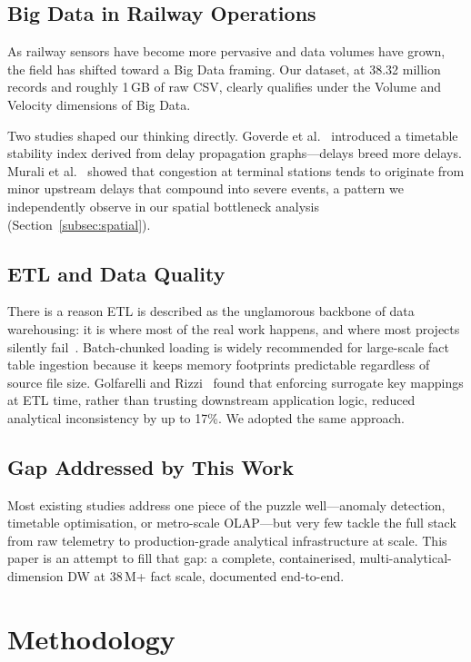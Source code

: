 \documentclass[conference]{IEEEtran}
\begin{document}
\subsection{Big Data in Railway Operations}

As railway sensors have become more pervasive and data volumes have grown,
the field has shifted toward a Big Data framing.
Our dataset, at 38.32 million records and roughly 1\,GB of raw CSV,
clearly qualifies under the Volume and Velocity dimensions of Big Data.

Two studies shaped our thinking directly.
Goverde et al.~\cite{b5} introduced a timetable stability index derived
from delay propagation graphs---delays breed more delays.
Murali et al.~\cite{b6} showed that congestion at terminal stations tends
to originate from minor upstream delays that compound into severe events, a
pattern we independently observe in our spatial bottleneck analysis
(Section~\ref{subsec:spatial}).

\subsection{ETL and Data Quality}

There is a reason ETL is described as the unglamorous backbone of data
warehousing: it is where most of the real work happens, and where most
projects silently fail~\cite{b7}.
Batch-chunked loading is widely recommended for large-scale fact table
ingestion because it keeps memory footprints predictable regardless of
source file size.
Golfarelli and Rizzi~\cite{b8} found that enforcing surrogate key mappings
at ETL time, rather than trusting downstream application logic, reduced
analytical inconsistency by up to 17\%.
We adopted the same approach.

\subsection{Gap Addressed by This Work}

Most existing studies address one piece of the puzzle well---anomaly
detection, timetable optimisation, or metro-scale OLAP---but very few
tackle the full stack from raw telemetry to production-grade analytical
infrastructure at scale.
This paper is an attempt to fill that gap: a complete, containerised,
multi-analytical-dimension DW at 38\,M+ fact scale, documented
end-to-end.

\section{Methodology}
\label{sec:methodology}
\end{document}
